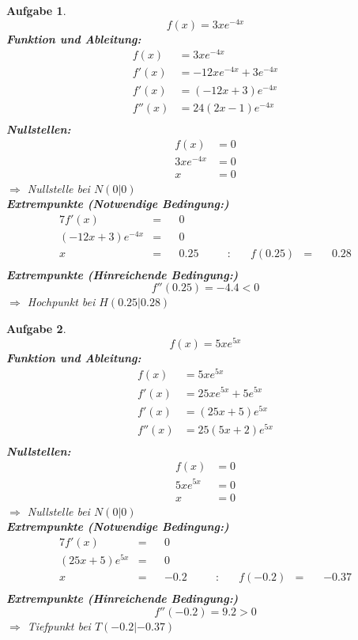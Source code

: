 \documentclass[12pt]{article}
\theoremstyle{note}
\newtheorem{aufgabe}{Aufgabe}
\begin{document}
\begin{flushleft}
\begin{aufgabe} ~  
$$f(x)=3 x e^{- 4 x}$$ 
{\bf Funktion und Ableitung:} 
\begin{align*} 
f(x)&=3 x e^{- 4 x}\\ 
f'(x)&=- 12 x e^{- 4 x} + 3 e^{- 4 x}\\ 
f'(x)&=\left(- 12 x + 3\right) e^{- 4 x}\\ 
f''(x)&=24 \left(2 x - 1\right) e^{- 4 x}\\ 
\end{align*} 
{\bf Nullstellen:} 
\begin{align*} 
f(x)&=0 \\ 
3 x e^{- 4 x}&=0 \\ 
x&=0\end{align*} 
$\Rightarrow$ Nullstelle bei $N(0|0)$ \\ 
{\bf Extrempunkte (Notwendige Bedingung:)} 
\begin{alignat*}{7} 
f'(x)&=& &0& \\ 
\left(- 12 x + 3\right) e^{- 4 x}&=& &0& \\ 
x&=& &0.25& \quad &:& \quad f(0.25)&=& \, &0.28\\ 
\end{alignat*} 
{\bf Extrempunkte (Hinreichende Bedingung:)} 
\\ 
$$f''(0.25)=-4.4< 0 $$ 
$\Rightarrow$ Hochpunkt bei $H(0.25|0.28)$ \\ 

\end{aufgabe}\clearpage\begin{aufgabe} ~  
$$f(x)=5 x e^{5 x}$$ 
{\bf Funktion und Ableitung:} 
\begin{align*} 
f(x)&=5 x e^{5 x}\\ 
f'(x)&=25 x e^{5 x} + 5 e^{5 x}\\ 
f'(x)&=\left(25 x + 5\right) e^{5 x}\\ 
f''(x)&=25 \left(5 x + 2\right) e^{5 x}\\ 
\end{align*} 
{\bf Nullstellen:} 
\begin{align*} 
f(x)&=0 \\ 
5 x e^{5 x}&=0 \\ 
x&=0\end{align*} 
$\Rightarrow$ Nullstelle bei $N(0|0)$ \\ 
{\bf Extrempunkte (Notwendige Bedingung:)} 
\begin{alignat*}{7} 
f'(x)&=& &0& \\ 
\left(25 x + 5\right) e^{5 x}&=& &0& \\ 
x&=& &-0.2& \quad &:& \quad f(-0.2)&=& \, &-0.37\\ 
\end{alignat*} 
{\bf Extrempunkte (Hinreichende Bedingung:)} 
\\ 
$$f''(-0.2)=9.2> 0 $$ 
$\Rightarrow$ Tiefpunkt bei $T(-0.2|-0.37)$ \\ 


\end{aufgabe}
\end{flushleft}
\end{document}
